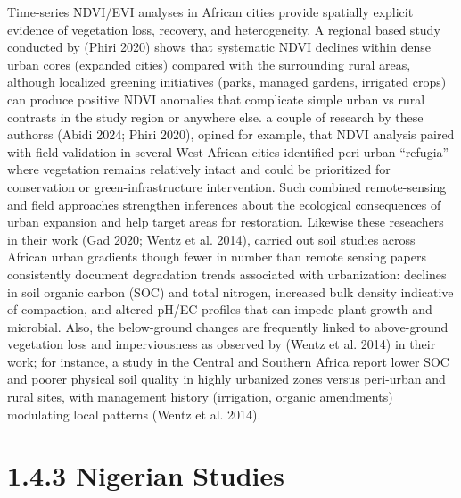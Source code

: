 Time-series NDVI/EVI analyses in African cities provide spatially explicit evidence of vegetation loss, recovery, and heterogeneity. A regional based study conducted by (Phiri 2020) shows that systematic NDVI declines within dense urban cores (expanded cities) compared with the surrounding rural areas, although localized greening initiatives (parks, managed gardens, irrigated crops) can produce positive NDVI anomalies that complicate simple urban vs rural contrasts in the study region or anywhere else. a couple of research by these authorss (Abidi 2024; Phiri 2020), opined for example, that NDVI analysis paired with field validation in several West African cities identified peri-urban ``refugia'' where vegetation remains relatively intact and could be prioritized for conservation or green-infrastructure intervention. Such combined remote-sensing and field approaches strengthen inferences about the ecological consequences of urban expansion and help target areas for restoration.
Likewise these reseachers in their work (Gad 2020; Wentz et al. 2014), carried out soil studies across African urban gradients though fewer in number than remote sensing papers consistently document degradation trends associated with urbanization: declines in soil organic carbon (SOC) and total nitrogen, increased bulk density indicative of compaction, and altered pH/EC profiles that can impede plant growth and microbial. Also, the below-ground changes are frequently linked to above-ground vegetation loss and imperviousness as observed by (Wentz et al. 2014) in their work; for instance, a study in the Central and Southern Africa report lower SOC and poorer physical soil quality in highly urbanized zones versus peri-urban and rural sites, with management history (irrigation, organic amendments) modulating local patterns (Wentz et al. 2014).
\hypertarget{nigerian-studies}{%
\section{\texorpdfstring{\textbf{1.4.3 Nigerian Studies}}{1.4.3 Nigerian Studies}}\label{nigerian-studies}}

